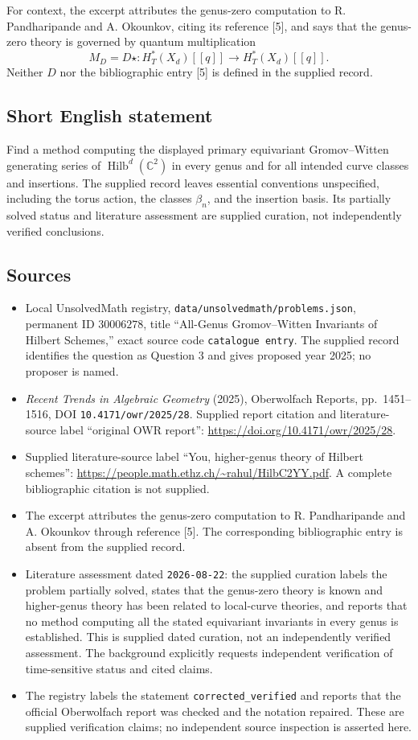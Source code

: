 \documentclass[11pt]{article}
\newcommand{\C}{\mathbb{C}}
\begin{document}
For context, the excerpt attributes the genus-zero computation to R. Pandharipande and A. Okounkov, citing its reference [5], and says that the genus-zero theory is governed by quantum multiplication
\[
M_D=D\star:
H_T^*(X_d)[[q]]\longrightarrow H_T^*(X_d)[[q]].
\]
Neither \(D\) nor the bibliographic entry [5] is defined in the supplied record.
\subsection{Short English statement}
Find a method computing the displayed primary equivariant Gromov--Witten generating series of \(\operatorname{Hilb}^{d}(\C^2)\) in every genus and for all intended curve classes and insertions. The supplied record leaves essential conventions unspecified, including the torus action, the classes \(\beta_n\), and the insertion basis. Its partially solved status and literature assessment are supplied curation, not independently verified conclusions.
\subsection{Sources}
\begin{itemize}
\item Local UnsolvedMath registry, \texttt{data/unsolvedmath/problems.json}, permanent ID \(30006278\), title ``All-Genus Gromov--Witten Invariants of Hilbert Schemes,'' exact source code \texttt{catalogue entry}. The supplied record identifies the question as Question 3 and gives proposed year 2025; no proposer is named.
\item \emph{Recent Trends in Algebraic Geometry} (2025), Oberwolfach Reports, pp.\ 1451--1516, DOI \texttt{10.4171/owr/2025/28}. Supplied report citation and literature-source label ``original OWR report'': \url{https://doi.org/10.4171/owr/2025/28}.
\item Supplied literature-source label ``You, higher-genus theory of Hilbert schemes'': \url{https://people.math.ethz.ch/~rahul/HilbC2YY.pdf}. A complete bibliographic citation is not supplied.
\item The excerpt attributes the genus-zero computation to R. Pandharipande and A. Okounkov through reference [5]. The corresponding bibliographic entry is absent from the supplied record.
\item Literature assessment dated \texttt{2026-08-22}: the supplied curation labels the problem partially solved, states that the genus-zero theory is known and higher-genus theory has been related to local-curve theories, and reports that no method computing all the stated equivariant invariants in every genus is established. This is supplied dated curation, not an independently verified assessment. The background explicitly requests independent verification of time-sensitive status and cited claims.
\item The registry labels the statement \texttt{corrected\_verified} and reports that the official Oberwolfach report was checked and the notation repaired. These are supplied verification claims; no independent source inspection is asserted here.
\end{itemize}
\end{document}
